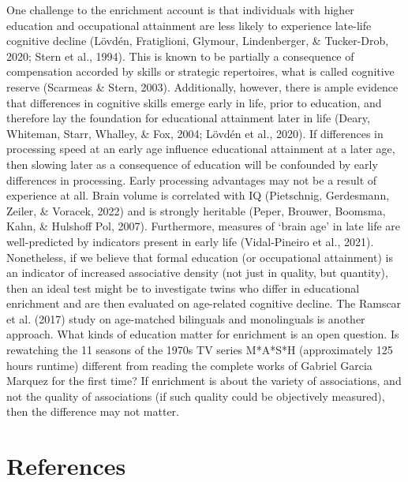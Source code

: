 \documentclass[
  man,floatsintext]{apa6}
\begin{document}
One challenge to the enrichment account is that individuals with higher education and occupational attainment are less likely to experience late-life cognitive decline (Lövdén, Fratiglioni, Glymour, Lindenberger, \& Tucker-Drob, 2020; Stern et al., 1994). This is known to be partially a consequence of compensation accorded by skills or strategic repertoires, what is called cognitive reserve (Scarmeas \& Stern, 2003). Additionally, however, there is ample evidence that differences in cognitive skills emerge early in life, prior to education, and therefore lay the foundation for educational attainment later in life (Deary, Whiteman, Starr, Whalley, \& Fox, 2004; Lövdén et al., 2020). If differences in processing speed at an early age influence educational attainment at a later age, then slowing later as a consequence of education will be confounded by early differences in processing. Early processing advantages may not be a result of experience at all. Brain volume is correlated with IQ (Pietschnig, Gerdesmann, Zeiler, \& Voracek, 2022) and is strongly heritable (Peper, Brouwer, Boomsma, Kahn, \& Hulshoff Pol, 2007). Furthermore, measures of `brain age' in late life are well-predicted by indicators present in early life (Vidal-Pineiro et al., 2021). Nonetheless, if we believe that formal education (or occupational attainment) is an indicator of increased associative density (not just in quality, but quantity), then an ideal test might be to investigate twins who differ in educational enrichment and are then evaluated on age-related cognitive decline. The Ramscar et al. (2017) study on age-matched bilinguals and monolinguals is another approach. What kinds of education matter for enrichment is an open question. Is rewatching the 11 seasons of the 1970s TV series M*A*S*H (approximately 125 hours runtime) different from reading the complete works of Gabriel Garcia Marquez for the first time? If enrichment is about the variety of associations, and not the quality of associations (if such quality could be objectively measured), then the difference may not matter.

\newpage

\hypertarget{references}{%
\section{References}\label{references}}
\end{document}
